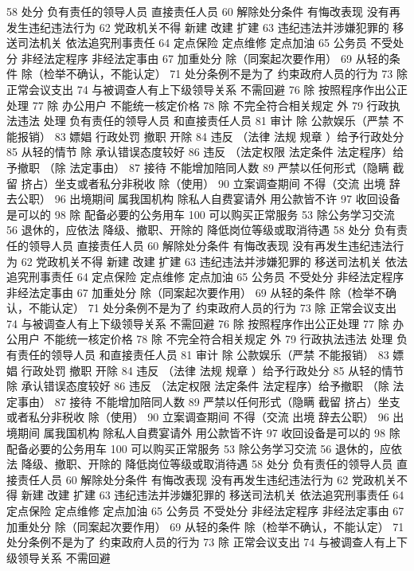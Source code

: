 \documentclass[cyan]{elegantnote}
\begin{document}
58 处分
负有责任的领导人员
直接责任人员
60 解除处分条件
有悔改表现
没有再发生违纪违法行为
62 党政机关不得
新建 改建 扩建
63 违纪违法并涉嫌犯罪的
移送司法机关
依法追究刑事责任
64 定点保险 定点维修 定点加油
65 公务员 不受处分
非经法定程序
非经法定事由
67 加重处分
除（同案起次要作用）
69 从轻的条件
除（检举不确认，不能认定）
71 处分条例不是为了
约束政府人员的行为
73 除 正常会议支出
74 与被调查人有上下级领导关系 不需回避
76 除 按照程序作出公正处理
77 除 办公用户
不能统一核定价格
78 除 不完全符合相关规定 外
79 行政执法违法 处理
负有责任的领导人员
和直接责任人员
81 审计
除 公款娱乐（严禁 不能报销）
83 嫖娼 行政处罚
撤职 开除
84 违反 （法律 法规 规章 ）给予行政处分
85 从轻的情节
除 承认错误态度较好
86 违反 （法定权限 法定条件 法定程序）给予撤职
（除 法定事由）
87 接待 不能增加陪同人数
89 严禁以任何形式（隐瞒 截留 挤占）坐支或者私分非税收
除（使用）
90 立案调查期间 不得（交流 出境 辞去公职）
96 出境期间 属我国机构 除私人自费宴请外 用公款皆不许
97 收回设备是可以的
98 除 配备必要的公务用车
100 可以购买正常服务
53 除公务学习交流
56 退休的，应依法
降级、撤职、开除的 降低岗位等级或取消待遇
58 处分
负有责任的领导人员
直接责任人员
60 解除处分条件
有悔改表现
没有再发生违纪违法行为
62 党政机关不得
新建 改建 扩建
63 违纪违法并涉嫌犯罪的
移送司法机关
依法追究刑事责任
64 定点保险 定点维修 定点加油
65 公务员 不受处分
非经法定程序
非经法定事由
67 加重处分
除（同案起次要作用）
69 从轻的条件
除（检举不确认，不能认定）
71 处分条例不是为了
约束政府人员的行为
73 除 正常会议支出
74 与被调查人有上下级领导关系 不需回避
76 除 按照程序作出公正处理
77 除 办公用户
不能统一核定价格
78 除 不完全符合相关规定 外
79 行政执法违法 处理
负有责任的领导人员
和直接责任人员
81 审计
除 公款娱乐（严禁 不能报销）
83 嫖娼 行政处罚
撤职 开除
84 违反 （法律 法规 规章 ）给予行政处分
85 从轻的情节
除 承认错误态度较好
86 违反 （法定权限 法定条件 法定程序）给予撤职
（除 法定事由）
87 接待 不能增加陪同人数
89 严禁以任何形式（隐瞒 截留 挤占）坐支或者私分非税收
除（使用）
90 立案调查期间 不得（交流 出境 辞去公职）
96 出境期间 属我国机构 除私人自费宴请外 用公款皆不许
97 收回设备是可以的
98 除 配备必要的公务用车
100 可以购买正常服务
53 除公务学习交流
56 退休的，应依法
降级、撤职、开除的 降低岗位等级或取消待遇
58 处分
负有责任的领导人员
直接责任人员
60 解除处分条件
有悔改表现
没有再发生违纪违法行为
62 党政机关不得
新建 改建 扩建
63 违纪违法并涉嫌犯罪的
移送司法机关
依法追究刑事责任
64 定点保险 定点维修 定点加油
65 公务员 不受处分
非经法定程序
非经法定事由
67 加重处分
除（同案起次要作用）
69 从轻的条件
除（检举不确认，不能认定）
71 处分条例不是为了
约束政府人员的行为
73 除 正常会议支出
74 与被调查人有上下级领导关系 不需回避
\end{document}
